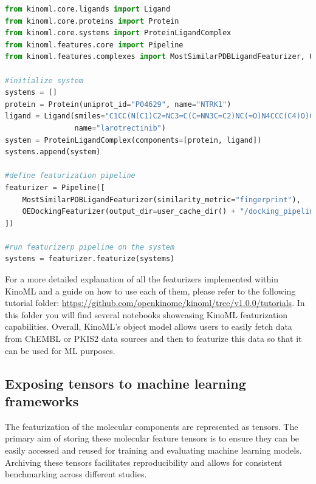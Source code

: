 \documentclass[9pt,lessons]{livecoms}
\begin{document}


\begin{lstlisting}[style=mystyle, language=Python, caption={Code snippet showing how to use the KinoML featurization pipeline to apply several featurizers on a system.}, label=lst:featurizers]
from kinoml.core.ligands import Ligand
from kinoml.core.proteins import Protein
from kinoml.core.systems import ProteinLigandComplex
from kinoml.features.core import Pipeline
from kinoml.features.complexes import MostSimilarPDBLigandFeaturizer, OEDockingFeaturizer

#initialize system
systems = []
protein = Protein(uniprot_id="P04629", name="NTRK1")
ligand = Ligand(smiles="C1CC(N(C1)C2=NC3=C(C=NN3C=C2)NC(=O)N4CCC(C4)O)C5=C(C=CC(=C5)F)F",
                name="larotrectinib")
system = ProteinLigandComplex(components=[protein, ligand])
systems.append(system)

#define featurization pipeline
featurizer = Pipeline([
    MostSimilarPDBLigandFeaturizer(similarity_metric="fingerprint"),
    OEDockingFeaturizer(output_dir=user_cache_dir() + "/docking_pipeline", method="Posit"),
])

#run featurizerp pipeline on the system
systems = featurizer.featurize(systems)

\end{lstlisting}

For a more detailed explanation of all the featurizers implemented within KinoML and a guide on how to use each of them, please refer to the following tutorial folder: \url{https://github.com/openkinome/kinoml/tree/v1.0.0/tutorials}. In this folder you will find several notebooks showcasing KinoML featurization capabilities. Overall, KinoML's object model allows users to easily fetch data from ChEMBL or PKIS2 data sources and then to featurize this data so that it can be used for ML purposes.


\subsection{Exposing tensors to machine learning frameworks}

The featurization of the molecular components are represented as tensors. The primary aim of storing these molecular feature tensors is to ensure they can be easily accessed and reused for training and evaluating machine learning models. Archiving these tensors facilitates reproducibility and allows for consistent benchmarking across different studies.
\end{document}
